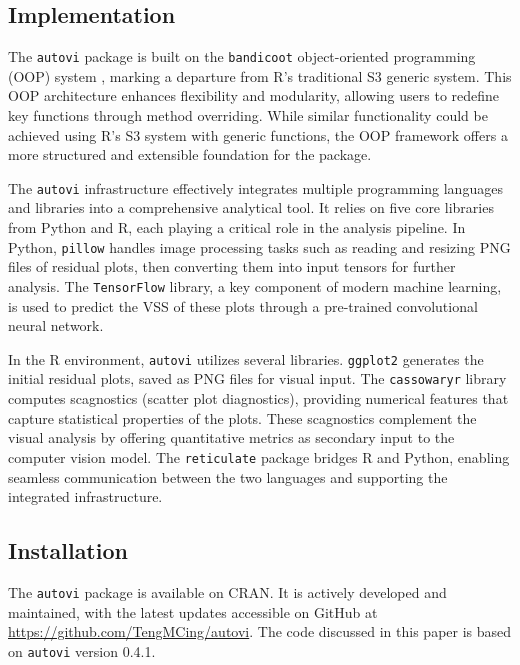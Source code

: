 \documentclass[
doublespace,
  times]{anzsauth}
\begin{document}
\subsection{Implementation}\label{sec-autovi-implementation}

The \texttt{autovi} package is built on the \texttt{bandicoot}
object-oriented programming (OOP) system \citep{bandicoot}, marking a
departure from R's traditional S3 generic system. This OOP architecture
enhances flexibility and modularity, allowing users to redefine key
functions through method overriding. While similar functionality could
be achieved using R's S3 system with generic functions, the OOP
framework offers a more structured and extensible foundation for the
package.

The \texttt{autovi} infrastructure effectively integrates multiple
programming languages and libraries into a comprehensive analytical
tool. It relies on five core libraries from Python and R, each playing a
critical role in the analysis pipeline. In Python, \texttt{pillow}
\citep{clark2015pillow} handles image processing tasks such as reading
and resizing PNG files of residual plots, then converting them into
input tensors for further analysis. The \texttt{TensorFlow}
\citep{abadi2016tensorflow} library, a key component of modern machine
learning, is used to predict the VSS of these plots through a
pre-trained convolutional neural network.

In the R environment, \texttt{autovi} utilizes several libraries.
\texttt{ggplot2} \citep{ggplot2} generates the initial residual plots,
saved as PNG files for visual input. The \texttt{cassowaryr}
\citep{mason2022cassowaryr} library computes scagnostics (scatter plot
diagnostics), providing numerical features that capture statistical
properties of the plots. These scagnostics complement the visual
analysis by offering quantitative metrics as secondary input to the
computer vision model. The \texttt{reticulate} \citep{reticulate}
package bridges R and Python, enabling seamless communication between
the two languages and supporting the integrated infrastructure.

\subsection{Installation}\label{installation}

The \texttt{autovi} package is available on CRAN. It is actively
developed and maintained, with the latest updates accessible on GitHub
at \url{https://github.com/TengMCing/autovi}. The code discussed in this
paper is based on \texttt{autovi} version 0.4.1.
\end{document}
